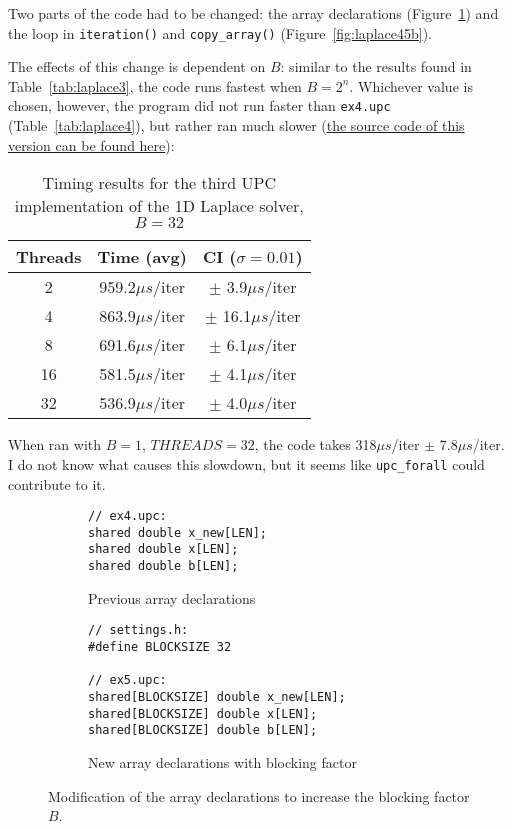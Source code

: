 \documentclass[12pt]{article}
\newcommand{\us}[0]{${\mu}s$}
\begin{document}
Two parts of the code had to be changed: the array declarations (Figure~\ref{fig:laplace45a}) and the loop in \texttt{iteration()} and \texttt{copy\_array()} (Figure~\ref{fig:laplace45b}).

The effects of this change is dependent on $B$: similar to the results found in Table~\ref{tab:laplace3}, the code runs fastest when $B = 2^n$.
Whichever value is chosen, however, the program did not run faster than \texttt{ex4.upc} (Table~\ref{tab:laplace4}), but rather ran much slower (\href{https://github.com/adri326/pc40-upc/tree/main/laplace/ex5.upc}{the source code of this version can be found here}):

\begin{table}[ht]
  \centering\begin{tabular}{|c|c|c|}
    \hline
    Threads & Time (avg) & CI ($\sigma=0.01$) \\
    \hline
    2 & 959.2\us/iter & $\pm$ 3.9\us/iter \\
    4 & 863.9\us/iter & $\pm$ 16.1\us/iter \\
    8 & 691.6\us/iter & $\pm$ 6.1\us/iter \\
    16 & 581.5\us/iter & $\pm$ 4.1\us/iter \\
    32 & 536.9\us/iter & $\pm$ 4.0\us/iter \\
    \hline
  \end{tabular}
  \caption{Timing results for the third UPC implementation of the 1D Laplace solver, $B = 32$}
  \label{tab:laplace5}
\end{table}

When ran with $B = 1$, $THREADS = 32$, the code takes 318\us/iter $\pm$ 7.8\us/iter.
I do not know what causes this slowdown, but it seems like \texttt{upc\_forall} could contribute to it.

\begin{figure}[ht]
  \begin{subfigure}[b]{0.49\columnwidth}
    \begin{lstlisting}[style=C, numbers=none]
// ex4.upc:
shared double x_new[LEN];
shared double x[LEN];
shared double b[LEN];
    \end{lstlisting}
    \caption{Previous array declarations}
  \end{subfigure}
  \hfill
  \begin{subfigure}[b]{0.49\columnwidth}
    \begin{lstlisting}[style=C, numbers=none]
// settings.h:
#define BLOCKSIZE 32

// ex5.upc:
shared[BLOCKSIZE] double x_new[LEN];
shared[BLOCKSIZE] double x[LEN];
shared[BLOCKSIZE] double b[LEN];
    \end{lstlisting}
    \caption{New array declarations with blocking factor}
  \end{subfigure}
  \caption{Modification of the array declarations to increase the blocking factor $B$.}
  \label{fig:laplace45a}
\end{figure}
\end{document}
